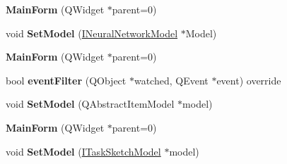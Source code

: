 \begin{DoxyCompactItemize}
{\bfseries Main\+Form} (Q\+Widget $\ast$parent=0)
\item 
\mbox{\label{class_main_form_a69da72ae01b90a41559c050e81020135}} 
void {\bfseries Set\+Model} (\hyperlink{class_i_neural_network_model}{I\+Neural\+Network\+Model} $\ast$Model)
\item 
\mbox{\label{class_main_form_a8407ed1ab0a7b7bef115711157c8f344}} 
{\bfseries Main\+Form} (Q\+Widget $\ast$parent=0)
\item 
\mbox{\label{class_main_form_a1ca32d59dddffa2396c8175e4dbcff58}} 
bool {\bfseries event\+Filter} (Q\+Object $\ast$watched, Q\+Event $\ast$event) override
\item 
\mbox{\label{class_main_form_aa6a63e62eb08de727aba05a0a20c3d3e}} 
void {\bfseries Set\+Model} (Q\+Abstract\+Item\+Model $\ast$model)
\item 
\mbox{\label{class_main_form_a8407ed1ab0a7b7bef115711157c8f344}} 
{\bfseries Main\+Form} (Q\+Widget $\ast$parent=0)
\item 
\mbox{\label{class_main_form_a4d6783977b0be48e1523fd03d836e64b}} 
void {\bfseries Set\+Model} (\hyperlink{class_i_task_sketch_model}{I\+Task\+Sketch\+Model} $\ast$model)
\end{DoxyCompactItemize}
